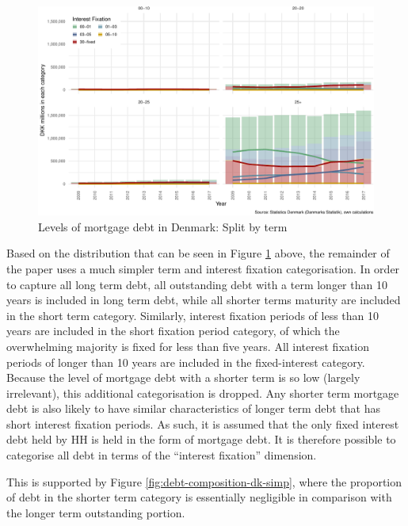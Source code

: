 \documentclass[
]{book}
\begin{document}
\begin{figure}
\centering
\includegraphics{figures/debt-values-dk-det-term-1.pdf}
\caption{\label{fig:debt-values-dk-det-term}Levels of mortgage debt in Denmark: Split by term}
\end{figure}

Based on the distribution that can be seen in Figure \ref{fig:debt-values-dk-det-term} above, the remainder of the paper uses a much simpler term and interest fixation categorisation. In order to capture all long term debt, all outstanding debt with a term longer than 10 years is included in long term debt, while all shorter terms maturity are included in the short term category. Similarly, interest fixation periods of less than 10 years are included in the short fixation period category, of which the overwhelming majority is fixed for less than five years. All interest fixation periods of longer than 10 years are included in the fixed-interest category. Because the level of mortgage debt with a shorter term is so low (largely irrelevant), this additional categorisation is dropped. Any shorter term mortgage debt is also likely to have similar characteristics of longer term debt that has short interest fixation periods. As such, it is assumed that the only fixed interest debt held by HH is held in the form of mortgage debt. It is therefore possible to categorise all debt in terms of the ``interest fixation'' dimension.

This is supported by Figure \ref{fig:debt-composition-dk-simp}, where the proportion of debt in the shorter term category is essentially negligible in comparison with the longer term outstanding portion.
\end{document}
